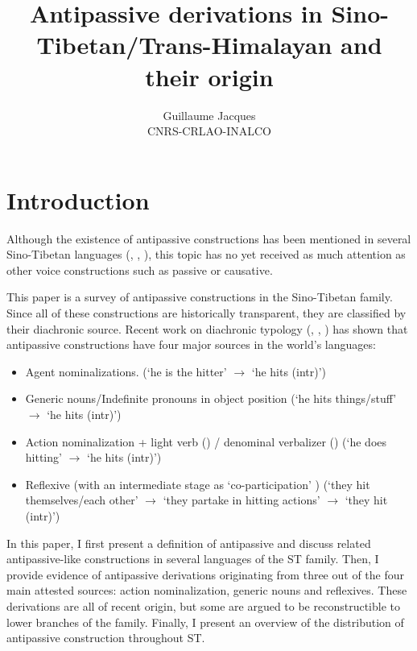 \documentclass[oneside,a4paper,11pt]{article}
\begin{document}
 
\title{Antipassive derivations in Sino-Tibetan/Trans-Himalayan and their origin}
\author{Guillaume Jacques\\ CNRS-CRLAO-INALCO}
\maketitle

\section*{Introduction}
Although the existence of antipassive constructions has been mentioned in several Sino-Tibetan languages (\citealt[225-7]{doornenbal09}, \citealt{jacques14antipassive}, \citealt{bickel15antipassive}), this topic has no yet received as much attention as other voice constructions such as passive or causative.

This paper is a survey of antipassive constructions in the Sino-Tibetan family. Since all of these constructions are historically transparent, they are classified by their diachronic source. Recent work on diachronic typology (\citealt[235]{janic.these},  \citealt{jacques14antipassive}, \citealt{sanso17antipassive}) has shown that antipassive constructions have four major sources in the world's languages:
\begin{itemize}
\item Agent nominalizations. (`he is the hitter' $\rightarrow$  `he hits (intr)')
\item Generic nouns/Indefinite pronouns in object position  (`he hits things/stuff' $\rightarrow$  `he hits (intr)')
\item Action nominalization + light verb (\citealt{creissels12antip}) / denominal verbalizer (\citealt{jacques14antipassive}) (`he does hitting' $\rightarrow$  `he hits (intr)')
\item Reflexive (with an intermediate stage as `co-participation' \citet{creissels08coparticipation}) (`they hit themselves/each other' $\rightarrow$  `they partake in hitting actions' $\rightarrow$  `they hit (intr)')
\end{itemize}

In this paper, I first present a definition of antipassive and discuss related antipassive-like constructions in several languages of the ST family. Then, I provide evidence of antipassive derivations originating from three out of the four main attested sources: action nominalization, generic nouns and reflexives. These derivations are all of recent origin, but some are argued to be reconstructible to lower branches of the family. Finally, I present an overview of the distribution of antipassive construction throughout ST.
\end{document}
